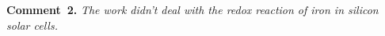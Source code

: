 \documentclass[a4paper,fleqn]{cas-sc}
\begin{document}
%
%

\vspace{1cm}
\noindent
\textcolor[rgb]{0.00,0.50,1.00}{\textbf{Comment~2.}}
\emph{The work didn't deal with the redox reaction of iron in silicon solar cells.}
\end{document}
